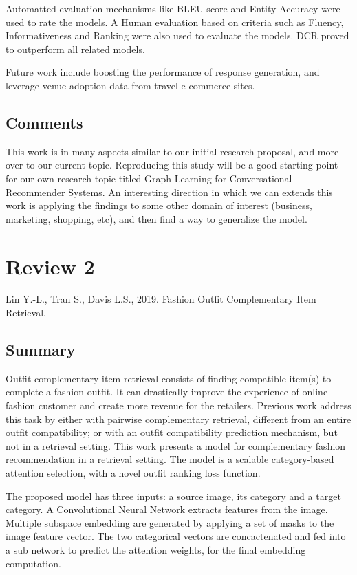 \documentclass{article}
\begin{document}
Automatted evaluation mechanisms like BLEU score and Entity Accuracy 
were used to rate the models. A Human evaluation based on criteria such 
as Fluency, Informativeness and Ranking were also used to evaluate the models. 
DCR proved to outperform all related models. 

Future work include boosting the performance of response generation, and 
leverage venue adoption data from travel e-commerce sites.

\subsection*{Comments}
This work is in many aspects similar to our initial research proposal, and 
more over to our current topic. Reproducing this study will be a good 
starting point for our own research topic titled Graph Learning for 
Conversational Recommender Systems.  An interesting direction in which 
we can extends this work is applying the findings to some other 
domain of interest (business, marketing, shopping, etc), and then 
find a way to generalize the model.

\section*{Review 2}
Lin Y.-L., Tran S., Davis L.S., 2019. Fashion Outfit Complementary 
Item Retrieval.

\subsection*{Summary}
Outfit complementary item retrieval consists of finding compatible item(s) 
to complete a fashion outfit. It can drastically improve the experience of 
online fashion customer and create more revenue for the retailers.
Previous work address this task by either with pairwise complementary 
retrieval, different from an entire outfit compatibility; or with an 
outfit compatibility prediction mechanism, but not in a retrieval setting.
This work presents a model for complementary fashion recommendation in a 
retrieval setting. The model is a scalable category-based attention selection, 
with a novel outfit ranking loss function.

The proposed model has three inputs: a source image, its category and a 
target category. A Convolutional Neural Network extracts features from the 
image. Multiple subspace embedding are generated by applying a set of masks 
to the image feature vector. The two categorical vectors are concactenated and 
fed into a sub network to predict the attention weights, for the final 
embedding computation.
\end{document}
